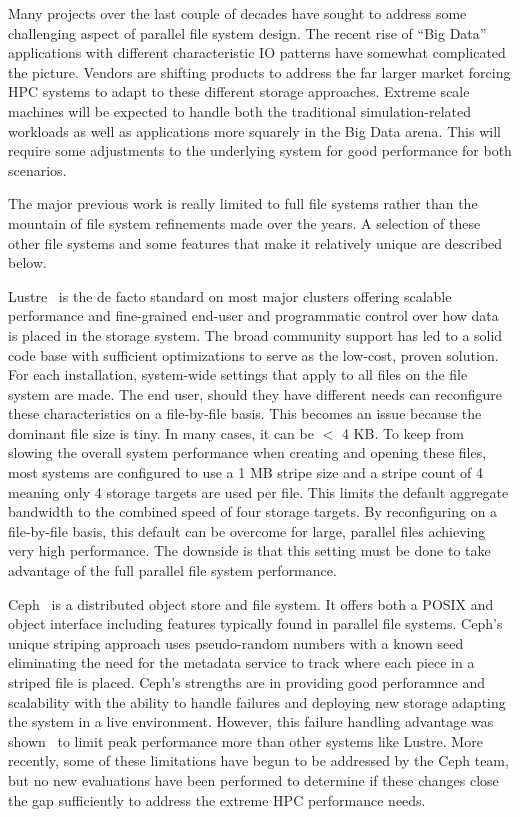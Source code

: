 \documentclass[conference]{IEEEtran} \pdfpagewidth=8.5in
\begin{document}
Many projects over the last couple of decades have sought to address some
challenging aspect of parallel file system design. The recent rise of ``Big
Data'' applications with different characteristic IO patterns have somewhat
complicated the picture. Vendors are shifting products to address the far
larger market forcing HPC systems to adapt to these different storage
approaches. Extreme scale machines will be expected to handle both the
traditional simulation-related workloads as well as applications more
squarely in the Big Data arena. This will require some adjustments to the
underlying system for good performance for both scenarios.

The major previous work is really limited to full file systems rather than the
mountain of file system refinements made over the years. A selection of these
other file systems and some features that make it relatively unique are
described below.

Lustre~\cite{braam:lustre-arch} is the de facto standard on most major clusters
offering scalable performance and fine-grained end-user and programmatic
control over how data is placed in the storage system. The broad community
support has led to a solid code base with sufficient optimizations to serve as
the low-cost, proven solution. For each installation, system-wide settings that
apply to all files on the file system are made. The end user, should they have
different needs can reconfigure these characteristics on a file-by-file basis.
This becomes an issue because the dominant file size is tiny. In many cases, it
can be $<$ 4 KB.  To keep from slowing the overall system performance when
creating and opening these files, most systems are configured to use a 1 MB
stripe size and a stripe count of 4 meaning only 4 storage targets are used per
file. This limits the default aggregate bandwidth to the combined speed of four
storage targets. By reconfiguring on a file-by-file basis, this default can be
overcome for large, parallel files achieving very high performance. The
downside is that this setting must be done to take advantage of the full
parallel file system performance.

Ceph~\cite{weil:ceph} is a distributed object store and file system. It offers
both a POSIX and object interface including features typically found in
parallel file systems. Ceph's unique striping approach uses pseudo-random
numbers with a known seed eliminating the need for the metadata service to
track where each piece in a striped file is placed. Ceph's strengths are in
providing good perforamnce and scalability with the ability to handle failures
and deploying new storage adapting the system in a live environment. However,
this failure handling advantage was shown~\cite{wang:2013:ceph} to limit peak
performance more than other systems like Lustre.  More recently, some of these
limitations have begun to be addressed by the Ceph team, but no new evaluations
have been performed to determine if these changes close the gap sufficiently to
address the extreme HPC performance needs.
\end{document}
